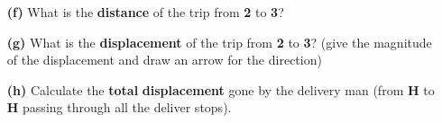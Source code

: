 \documentclass[A4,12pt]{article}
\begin{document}
\begin{enumerate}[label=\bfseries (\arabic*)]
\begin{itemize}
    \item[\bf (f)] What is the \textbf{distance} of the trip from \textbf{2} to \textbf{3}?
    \item[\bf (g)] What is the \textbf{displacement} of the trip from \textbf{2} to \textbf{3}? (give the magnitude of the displacement and draw an arrow for the direction)
    \item[\bf (h)] Calculate the \textbf{total} \textbf{displacement} gone by the delivery man (from \textbf{H} to \textbf{H} passing through all the deliver stops).
\end{itemize}














\end{enumerate}
\end{document}
